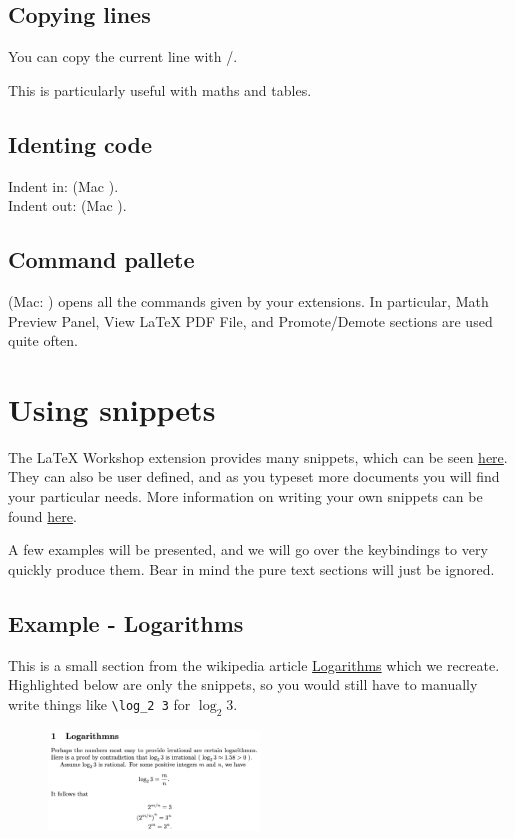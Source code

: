\subsection{Copying lines}
You can copy the current line with \keys{\shift + \Alt + \arrowkeyup}/\keys{\arrowkeydown}.

This is particularly useful with maths and tables.

\subsection{Identing code}
Indent in: \keys{\ctrl + ]} (Mac \keys{\cmd + ]}).\\
Indent out: \keys{\ctrl + [} (Mac \keys{\cmd + [}).
\subsection{Command pallete}
 (Mac: ) opens all the commands given by your extensions.
In particular, Math Preview Panel, View LaTeX PDF File, and Promote/Demote sections are used quite often.


\section{Using snippets}
The LaTeX Workshop extension provides many snippets, which can be seen \href{https://github.com/James-Yu/LaTeX-Workshop/wiki/Snippets}{here}.
They can also be user defined, and as you typeset more documents you will find your particular needs.
More information on writing your own snippets can be found \href{https://code.visualstudio.com/docs/editor/userdefinedsnippets}{here}.

A few examples will be presented, and we will go over the keybindings to very quickly produce them.
Bear in mind the pure text sections will just be ignored.

\subsection{Example - Logarithms}
This is a small section from the wikipedia article \href{https://en.wikipedia.org/wiki/Irrational_number#Logarithms}{Logarithms} which we recreate.
Highlighted below are only the snippets, so you would still have to manually write things like \verb|\log_2 3| for \( \log_2 3 \).

\begin{figure}[h]
\centering
    \includegraphics[width=0.5\textwidth]{figures/logarithmns.png}
\end{figure}

